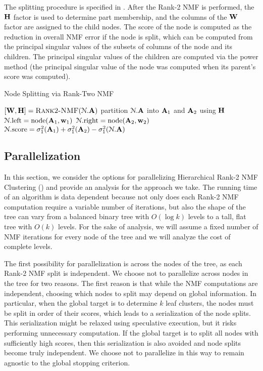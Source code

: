 \documentclass[conference,compsoc]{IEEEtran}
\begin{document}
The splitting procedure is specified in .
After the Rank-2 NMF is performed, the $\M{H}$ factor is used to determine part membership, and the columns of the $\M{W}$ factor are assigned to the child nodes.
The score of the node is computed as the reduction in overall NMF error if the node is split, which can be computed from the principal singular values of the subsets of columns of the node and its children.
The principal singular values of the children are computed via the power method (the principal singular value of the node was computed when its parent's score was computed).

\begin{algorithm}
\caption{Node Splitting via Rank-Two NMF}
\label{alg:split}
\begin{algorithmic}[1]
		\State $[\M{W},\M{H}] = \textsc{Rank2-NMF}({\cal N}.\M{A})$ \hfill {}
		\State partition ${\cal N}.\M{A}$ into $\M{A}_1$ and $\M{A}_2$ using $\M{H}$
		\State ${\cal N}.\text{left} = \text{node}(\M{A}_1,\V{W}_1)$ \hfill {}
		\State ${\cal N}.\text{right} = \text{node}(\M{A}_2,\V{W}_2)$ \hfill {}
		\State ${\cal N}.\text{score} = \sigma_1^2(\M{A}_1) + \sigma_1^2(\M{A}_2) - \sigma_1^2({\cal N}.\M{A})$
	\EndFunction
\end{algorithmic}
\end{algorithm}

\subsection{Parallelization}

In this section, we consider the options for parallelizing Hierarchical Rank-2 NMF Clustering () and provide an analysis for the approach we take.
The running time of an algorithm is data dependent because not only does each Rank-2 NMF computation require a variable number of iterations, but also the shape of the tree can vary from a balanced binary tree with $O(\log k)$ levels to a tall, flat tree with $O(k)$ levels.
For the sake of analysis, we will assume a fixed number of NMF iterations for every node of the tree and we will analyze the cost of complete levels.

The first possibility for parallelization is across the nodes of the tree, as each Rank-2 NMF split is independent.
We choose not to parallelize across nodes in the tree for two reasons.
The first reason is that while the NMF computations are independent, choosing which nodes to split may depend on global information.
In particular, when the global target is to determine $k$ leaf clusters, the nodes must be split in order of their scores, which leads to a serialization of the node splits.
This serialization might be relaxed using speculative execution, but it risks performing unnecessary computation.
If the global target is to split all nodes with sufficiently high scores, then this serialization is also avoided and node splits become truly independent.
We choose not to parallelize in this way to remain agnostic to the global stopping criterion.
\end{document}
